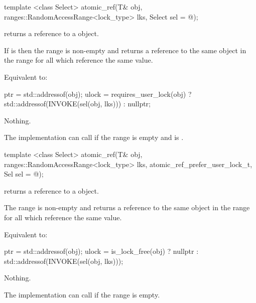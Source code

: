 \begin{addedblock}
\begin{itemdecl}
template <class Select>
atomic_ref(T& obj, ranges::RandomAccessRange<lock_type> lks, 
  Select sel = @\unspec@ );
\end{itemdecl}

\begin{itemdescr}
\pnum
\mandates {} returns
a reference to a  object.

\pnum
\expects If  is  then the 
range  is non-empty and  returns a
reference to the same  object in the range  for
all  which reference the same value. 

\pnum
\effects Equivalent to:
\begin{codeblock}
  ptr = std::addressof(obj);
  ulock = requires_user_lock(obj) ? 
    std::addressof(INVOKE(sel(obj, lks))) : nullptr;
\end{codeblock}

\pnum
\throws Nothing.

\pnum
\remarks The implementation can call  if the range  is empty and
 is .

\end{itemdescr}
\end{addedblock}


\begin{addedblock}
\begin{itemdecl}
template <class Select>
atomic_ref(T& obj, ranges::RandomAccessRange<lock_type> lks,
  atomic_ref_prefer_user_lock_t, Sel sel = @\unspec@ );
\end{itemdecl}

\begin{itemdescr}
\pnum
\mandates {} returns
a reference to a  object.

\pnum
\expects The range  is non-empty and  returns a
reference to the same  object in the range  for
all  which reference the same value. 

\pnum
\effects Equivalent to:
\begin{codeblock}
  ptr = std::addressof(obj);
  ulock = is_lock_free(obj) ? 
    nullptr : std::addressof(INVOKE(sel(obj, lks)));
\end{codeblock}

\pnum
\throws Nothing.

\pnum
\remarks The implementation can call  if the range  is empty.

\end{itemdescr}
\end{addedblock}


